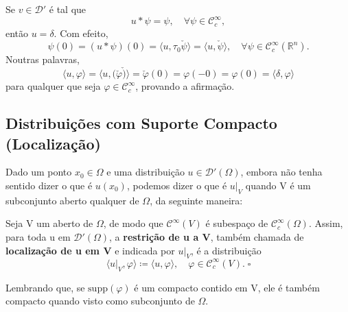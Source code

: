 \documentclass[../distribution_theory_notes.tex]{subfiles}
\begin{document}
\begin{tcolorbox}[
		skin=enhanced,
		title=Observação,
		fonttitle=\bfseries,
		colframe=black,
		colbacktitle=cyan!75!white,
		colback=cyan!15,
		colbacklower=black,
		coltitle=black,
		drop fuzzy shadow,
	]
	Se \(v\in \mathcal{D}'\) é tal que
	\[
		u*\psi =\psi ,\quad \forall \psi \in \mathcal{C}_{c}^{\infty},
	\]
	então \(u = \delta \). Com efeito,
	\[
		\psi (0)=(u*\psi )(0)=\langle u, \tau_{0}\check{\psi} \rangle = \langle u, \check{\psi } \rangle,\quad \forall \psi \in \mathcal{C}_{c}^{\infty}(\mathbb{R}^{n}).
	\]
	Noutras palavras,
	\[
		\langle u, \varphi  \rangle = \langle u, (\check{\varphi }\check{)} \rangle = \check{\varphi }(0) = \varphi (-0)=\varphi (0)=\langle \delta , \varphi  \rangle
	\]
	para qualquer que seja \(\varphi \in \mathcal{C}_{c}^{\infty}\), provando a afirmação.
\end{tcolorbox}

\subsection{Distribuições com Suporte Compacto (Localização)}
Dado um ponto \(x_{0}\in \Omega \) e uma distribuição \(u\in \mathcal{D}'(\Omega )\), embora não tenha sentido dizer o que é \(u(x_{0})\), podemos dizer o que é \(u|_{V}\) quando V é um subconjunto aberto qualquer de \(\Omega \), da seguinte maneira:
\begin{def*}
	Seja V um aberto de \(\Omega \), de modo que \(\mathcal{C}^{\infty}(V)\) é subespaço de \(\mathcal{C}_{c}^{\infty}(\Omega )\). Assim, para toda u em \(\mathcal{D}'(\Omega )\), a \textbf{restrição de u a V}, também chamada de \textbf{localização de u em V} e indicada por \(u|_{V}\), é a distribuição
	\[
		\langle u|_{V}, \varphi\rangle\coloneqq \langle u, \varphi  \rangle,\quad \varphi \in \mathcal{C}_{c}^{\infty}(V). \;\square
	\]
\end{def*}
Lembrando que, se \(\mathrm{supp}(\varphi )\) é um compacto contido em V, ele é também compacto quando visto como subconjunto de \(\Omega \).
\end{document}
